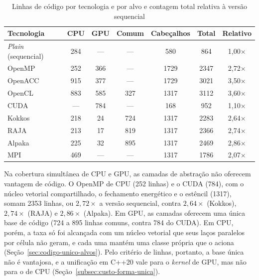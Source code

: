\begin{table}[H]
    \centering
    \caption{Linhas de código por tecnologia e por alvo e contagem total relativa à versão sequencial}
    \label{tab:complexidade-loc-tecnologias}
    \footnotesize
    \begin{tabular}{lcccccc}
        \toprule
        Tecnologia & CPU & GPU & Comum & Cabeçalhos & Total & Relativo \\
        \midrule
        \textit{Plain} (sequencial) & 284 & --- & --- & 580 & 864 & 1{,}00\(\times\) \\
        OpenMP & 252 & 366 & --- & 1729 & 2347 & 2{,}72\(\times\) \\
        OpenACC & 915 & 377 & --- & 1729 & 3021 & 3{,}50\(\times\) \\
        OpenCL & 883 & 585 & 327 & 1317 & 3112 & 3{,}60\(\times\) \\
        CUDA & --- & 784 & --- & 168 & 952 & 1{,}10\(\times\) \\
        Kokkos & 218 & 24 & 724 & 1317 & 2283 & 2{,}64\(\times\) \\
        RAJA & 213 & 17 & 819 & 1317 & 2366 & 2{,}74\(\times\) \\
        Alpaka & 225 & 32 & 895 & 1317 & 2469 & 2{,}86\(\times\) \\
        MPI & 469 & --- & --- & 1317 & 1786 & 2{,}07\(\times\) \\
        \bottomrule
    \end{tabular}
\end{table}

Na cobertura simultânea de CPU e GPU, as camadas de abstração não oferecem vantagem de código.
O OpenMP de CPU (252 linhas) e o CUDA (784), com o núcleo vetorial compartilhado, o fechamento energético e o estêncil (1317), somam 2353 linhas, ou \(2{,}72\times\) a versão sequencial, contra \(2{,}64\times\) (Kokkos), \(2{,}74\times\) (RAJA) e \(2{,}86\times\) (Alpaka).
Em GPU, as camadas oferecem uma única base de código (724 a 895 linhas comuns, contra 784 do CUDA).
Em CPU, porém, a taxa só foi alcançada com um núcleo vetorial que seus laços paralelos por célula não geram, e cada uma mantém uma classe própria que o aciona (Seção~\ref{sec:codigo-unico-alvos}).
Pelo critério de linhas, portanto, a base única não é vantajosa, e a unificação em C++20 vale para o \textit{kernel} de GPU, mas não para o de CPU (Seção~\ref{subsec:custo-forma-unica}).

